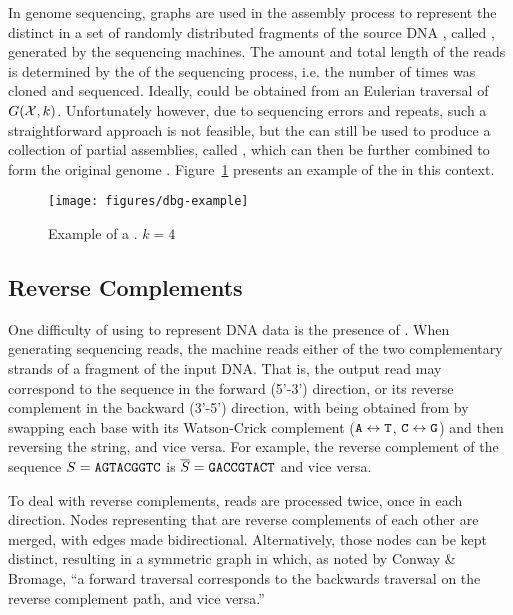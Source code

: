 In genome sequencing, \dB graphs are used in the assembly process to represent the distinct  in a set \readset of randomly distributed fragments of the source DNA , called , generated by the sequencing machines. The amount and total length of the reads is determined by the  of the sequencing process, i.e. the number of times  was cloned and sequenced. Ideally,  could be obtained from an Eulerian traversal of $G(\readset, k)$. Unfortunately however, due to sequencing errors and repeats, such a straightforward approach is not feasible, but the \dBG can still be used to produce a collection of partial assemblies, called , which can then be further combined to form the original genome \cite{Pevzner2001}. Figure~\ref{fig:dbgexample} presents an example of the \dBG in this context.

\begin{figure}[htbp]
	\begin{center}
    \texttt{[image: figures/dbg-example]}
	\end{center}
	\caption{Example of a \dBG. $k=4$}\label{fig:dbgexample}
\end{figure}

\subsection{Reverse Complements}
\label{subsec:dBG-reversecomplements}

One difficulty of using  to represent DNA data is the presence of . When generating sequencing reads, the machine reads either of the two complementary strands of a fragment of the input DNA. That is, the output read may correspond to the sequence  in the forward (5'-3') direction, or its reverse complement  in the backward (3'-5') direction, with
 being obtained from  by swapping each base with its Watson-Crick complement
($\mathtt{A} \leftrightarrow \mathtt{T}$, $\mathtt{C} \leftrightarrow \mathtt{G}$) and then reversing the string, and vice versa. For example, the reverse complement of the sequence $S=\mathtt{AGTACGGTC}$ is $\overline{S}=\mathtt{GACCGTACT}$ and vice versa.

To deal with reverse complements, reads are processed twice, once in each direction. Nodes representing  that are reverse complements of each other are merged, with edges made bidirectional. Alternatively, those nodes can be kept distinct, resulting in a symmetric graph in which, as noted by Conway \& Bromage, ``a forward traversal corresponds to the backwards traversal on the reverse complement path, and vice versa.'' \cite{Conway2011}


